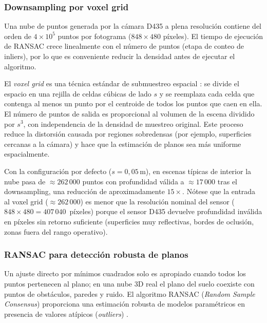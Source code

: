\subsubsection{Downsampling por voxel grid}
\label{subsec:lm-v3-voxel}

Una nube de puntos generada por la cámara D435 a plena resolución contiene
del orden de $4 \times 10^5$ puntos por fotograma ($848 \times 480$ píxeles).
El tiempo de ejecución de RANSAC crece linealmente con el número de puntos
(etapa de conteo de inliers), por lo que es conveniente reducir la densidad
antes de ejecutar el algoritmo.

El \emph{voxel grid} es una técnica estándar de submuestreo espacial
\cite{hornung2013octomap}: se divide el espacio en una rejilla de celdas
cúbicas de lado $s$ y se reemplaza cada celda que contenga al menos un punto
por el centroide de todos los puntos que caen en ella. El número de puntos de
salida es proporcional al volumen de la escena dividido por $s^3$, con
independencia de la densidad de muestreo original. Este proceso reduce la
distorsión causada por regiones sobredensas (por ejemplo, superficies
cercanas a la cámara) y hace que la estimación de planos sea más uniforme
espacialmente.

Con la configuración por defecto ($s = 0{,}05\,\text{m}$), en escenas típicas
de interior la nube pasa de $\approx 262\,000$ puntos con profundidad válida a
$\approx 17\,000$ tras el downsampling, una reducción de aproximadamente
$15\times$. Nótese que la entrada al voxel grid ($\approx 262\,000$) es menor
que la resolución nominal del sensor ($848 \times 480 = 407\,040$~píxeles)
porque el sensor D435 devuelve profundidad inválida en píxeles sin retorno
suficiente (superficies muy reflectivas, bordes de oclusión, zonas fuera del
rango operativo).

\subsubsection{RANSAC para detección robusta de planos}
\label{subsec:lm-v3-ransac}

Un ajuste directo por mínimos cuadrados solo es apropiado cuando todos los
puntos pertenecen al plano; en una nube 3D real el plano del suelo coexiste
con puntos de obstáculos, paredes y ruido. El algoritmo RANSAC (\emph{Random
Sample Consensus}) proporciona una estimación robusta de modelos paramétricos
en presencia de valores atípicos (\emph{outliers}) \cite{Thrun2005}.

